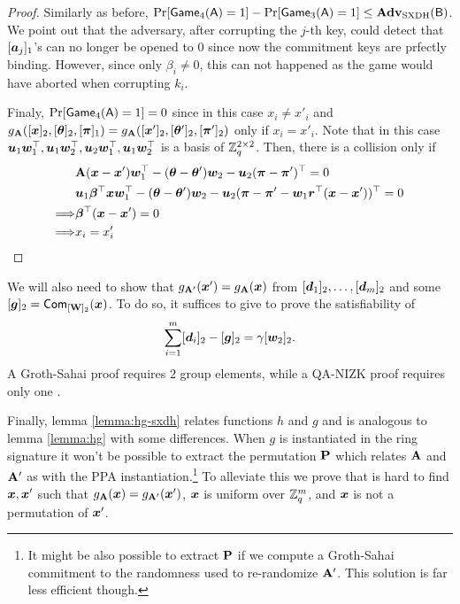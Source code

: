 \begin{proof}
Similarly as before, $\Pr[\mathsf{Game}_4(\mathsf{A})=1]-\Pr[\mathsf{Game}_3(\mathsf{A})=1]\leq\mathbf{Adv}_\mathrm{SXDH}(\mathsf{B})$. We point out that the adversary, after corrupting the $j$-th key, could detect that $[{\boldsymbol{a}}_j]_1$'s  can no longer be opened to 0 since now the commitment keys are prfectly binding. However, since only $\beta_i\neq 0$, this can not happened as the game would have aborted when corrupting $k_i$.

Finaly, $\Pr[\mathsf{Game}_4(\mathsf{A})=1]=0$ since in this case $x_i \neq x'_i$ and $g_{\mathbf{{A}}}([{\boldsymbol{x}}]_2,[{\boldsymbol{\theta}}]_2,\allowbreak[{\boldsymbol{\pi}}]_1)=g_{\mathbf{{A}}}([{\boldsymbol{x}}']_2,[{\boldsymbol{\theta}}']_2,[{\boldsymbol{\pi}}']_2)$  only if $x_i = x'_i$. Note that in this case ${\boldsymbol{u}}_1{\boldsymbol{w}}_1^\top,{\boldsymbol{u}}_1{\boldsymbol{w}}_2^\top,\allowbreak{\boldsymbol{u}}_2{\boldsymbol{w}}_1^\top,{\boldsymbol{u}}_1{\boldsymbol{w}}_2^\top$ is a basis of $\mathbb{Z}_q^{2\times 2}$. Then, there is a collision only if
\begin{align*}
&\matr{A}(\vecb{x}-\vecb{x}')\vecb{w}_1^\top - (\vec{\theta}-\vecb{\theta}')\vecb{w}_2 - \vecb{u}_2(\vecb{\pi}-\vecb{\pi}')^\top = 0\\
&\vecb{u}_1\vecb{\beta}^\top\vecb{x}\vecb{w}_1^\top - (\vec{\theta}-\vecb{\theta}')\vecb{w}_2 - \vecb{u}_2(\vecb{\pi}-\vecb{\pi}'-\vecb{w}_1\vecb{r}^\top(\vecb{x}-\vecb{x}'))^\top = 0\\
\Longrightarrow & \vecb{\beta}^\top(\vecb{x}-\vecb{x}') = 0\\
\Longrightarrow & x_i  = x'_i\\
\end{align*}
\end{proof}

We will also need to show that $g_{\mathbf{{A}}'}({\boldsymbol{x}}')= g_{\mathbf{{A}}}({\boldsymbol{x}})$ from $[{\boldsymbol{d}}_1]_2,\ldots,[{\boldsymbol{d}}_m]_2$ and some $[{\boldsymbol{g}}]_2 = \mathsf{Com}_{[\mathbf{{W}}]_2}({\boldsymbol{x}})$. To do so, it suffices to give to prove the satisfiability of
\begin{equation}
\sum_{i=1}^{m}[{\boldsymbol{d}}_i]_2 - [{\boldsymbol{g}}]_2 = \gamma[{\boldsymbol{w}}_2]_2.
\label{eq:coll-g}
\end{equation}
A Groth-Sahai proof requires $2$ group elements, while a QA-NIZK proof requires only one \cite{C:JutRoy14,EC:KilWee15}.


Finally, lemma \ref{lemma:hg-sxdh} relates functions $h$ and $g$ and is analogous to lemma \ref{lemma:hg} with some differences. When $g$ is instantiated in the ring signature it won't be possible to extract the permutation $\mathbf{{P}}$ which relates $\mathbf{{A}}$ and $\mathbf{{A}}'$ as with the PPA instantiation.\footnote{It might be also possible to extract $\mathbf{{P}}$ if we compute a Groth-Sahai commitment to the randomness used to re-randomize $\mathbf{{A}}'$. This solution is far less efficient though.} To alleviate this we prove that is hard to find ${\boldsymbol{x}},{\boldsymbol{x}}'$ such that $g_{\mathbf{{A}}}({\boldsymbol{x}})=g_{\mathbf{{A'}}}({\boldsymbol{x}}')$, ${\boldsymbol{x}}$ is uniform over $\mathbb{Z}_q^m$, and ${\boldsymbol{x}}$ is not a permutation of ${\boldsymbol{x}}'$.

